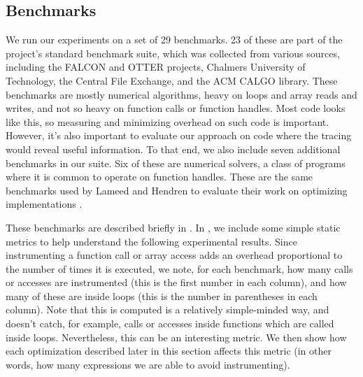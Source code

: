 \subsection{Benchmarks}

We run our experiments on a set of 29 \matlab benchmarks. 23 of these are part
of the \mclab project's standard benchmark suite, which was collected from
various sources, including the FALCON and OTTER projects, Chalmers University
of Technology, the \matlab Central File Exchange, and the ACM CALGO library.
These benchmarks are mostly numerical algorithms, heavy on loops and array
reads and writes, and not so heavy on function calls or function handles. Most
\matlab code looks like this, so measuring and minimizing overhead on such code
is important. However, it's also important to evaluate our approach on code
where the tracing would reveal useful information. To that end, we also include
seven additional benchmarks in our suite. Six of these are numerical solvers, a
class of programs where it is common to operate on function handles. These are
the same benchmarks used by Lameed and Hendren to evaluate their work on
optimizing  implementations \cite{OptimizingFeval}.

These benchmarks are described briefly in
. In
, we include some simple
static metrics to help understand the following experimental results. Since
instrumenting a function call or array access adds an overhead proportional to
the number of times it is executed, we note, for each benchmark, how many calls
or accesses are instrumented (this is the first number in each column), and how
many of these are inside loops (this is the number in parentheses in each
column). Note that this is computed is a relatively simple-minded way, and
doesn't catch, for example, calls or accesses inside functions which are called
inside loops. Nevertheless, this can be an interesting metric. We then show how
each optimization described later in this section affects this metric (in other
words, how many expressions we are able to avoid instrumenting).

